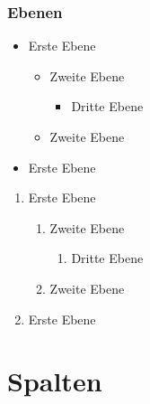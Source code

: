 \documentclass[t]{beamer}
\begin{document}
\begin{frame}
	\frametitle{Ebenen}
	\begin{itemize}
		\item Erste Ebene
			\begin{itemize}
				\item Zweite Ebene
				\begin{itemize}
					\item Dritte Ebene
				\end{itemize}
				\item Zweite Ebene
			\end{itemize}
		\item Erste Ebene
	\end{itemize}
	\begin{enumerate}	
		\item Erste Ebene
			\begin{enumerate}
				\item Zweite Ebene
				\begin{enumerate}
					\item Dritte Ebene
				\end{enumerate}
				\item Zweite Ebene
			\end{enumerate}
		\item Erste Ebene
	\end{enumerate}
\end{frame}

\section{Spalten} %
\end{document}
